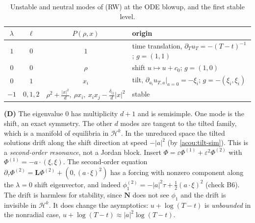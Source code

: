 \begin{table}[ht]
\centering\small
\begin{tabular}{@{}cccl@{}}
\toprule
$\lambda$ & $\ell$ & $P(\rho,x)$ & origin\\
\midrule
$1$ & $0$ & $1$ & time translation, $\partial_Tu_T=-(T-t)^{-1}$; $g=(1,1)$\\
$0$ & $0$ & $\rho$ & shift $u\mapsto u+c_0$; $g=(1,0)$\\
$0$ & $1$ & $x_i$ & tilt, $\partial_{a_i}u_{T,a}|_{a=0}=-\xi_i$; $g=-(\xi_i,\xi_i)$\\
$-1$ & $0,1,2$ & $\rho^2+\frac{|x|^2}{d},\ \rho x_i,\ x_ix_j-\frac{\delta_{ij}}{d}|x|^2$ & stable\\
\bottomrule
\end{tabular}
\caption{Unstable and neutral modes of (RW) at the ODE blowup, and the first stable level.}
\label{acou:tab-modes}
\end{table}

\begin{remark}[the $\lambda=0$ modes: no Jordan block, but a nonlinear drift]\label{acou:rem-drift}
\textbf{(D)} The eigenvalue $0$ has multiplicity $d+1$ and is semisimple. One
mode is the shift, an exact symmetry. The other $d$ modes are tangent to the
tilted family, which is a manifold of equilibria in $\mathcal H^k$. In the
unreduced space the tilted solutions drift along the shift direction at speed
$-|a|^2$ (by \eqref{acou:tilt-sim}). This is a \emph{second-order resonance},
not a Jordan block. Insert $\Phi=\varepsilon\Phi^{(1)}+\varepsilon^2\Phi^{(2)}$
with $\Phi^{(1)}=-a\cdot(\xi,\xi)$. The second-order equation
$\partial_\tau\Phi^{(2)}=\mathbf L\Phi^{(2)}+(0,(a\cdot\xi)^2)$ has a forcing
with nonzero component along the $\lambda=0$ shift eigenvector, and indeed
$\phi^{(2)}_1=-|a|^2\tau+\frac12(a\cdot\xi)^2$ (check B6). The drift is
harmless for stability, since $\mathbf N$ does not see $\phi_1$ and the drift
is invisible in $\mathcal H^k$. It does change the asymptotics:
$u+\log(T-t)$ is \emph{unbounded} in the nonradial case,
$u+\log(T-t)\approx|a|^2\log(T-t)$.
\end{remark}


